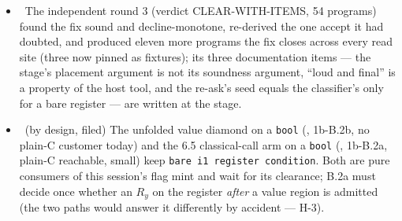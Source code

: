 \begin{itemize}
    decides ``same register'' at final taint --- so a rotation on a value derived from a
    classical-call merge is a \emph{source} to the fence and \emph{chained} to the lowering, and a
    sibling rotation on the same rail is invisible: the select's copies were controlled on
    \(R_y(0.9)R_y(0.25)|x\rangle\) while the condition named \(R_y(0.25)|x\rangle\), verify-clean and
    stage-2b clean. The \texttt{int} twin accepts on \texttt{main} with the same wrong stream ---
    pre-existing, filed as  (P1). Fixed by recording every emitted rail read and re-asking both
    rungs after the round-2 taint fixpoint, in both entry points, declining loudly (the pattern that
    already ships for the in-place rail tripwire); it is the third instance of the ``a stage that runs
    once has a round-2-false premise'' family and the first in a predicate rather than a stage. The
    fix's own first spelling missed one of the four places a register is read as a control (the
    nested conjunction), which the fix agent found from plain C before the third round --- the record
    now lives in the one function every such read goes through.
  \item \fdoc\ The independent round 3 (verdict CLEAR-WITH-ITEMS, 54 programs) found the fix sound
    and decline-monotone, re-derived the one accept it had doubted, and produced eleven more programs
    the fix closes across every read site (three now pinned as fixtures); its three documentation
    items --- the stage's placement argument is not its soundness argument, ``loud and final'' is a
    property of the host tool, and the re-ask's seed equals the classifier's only for a bare register
    --- are written at the stage.
  \item \foverdecline\ (by design, filed) The unfolded value diamond on a \texttt{bool} (,
    1b-B.2b, no plain-C customer today) and the 6.5 classical-call arm on a \texttt{bool} (,
    1b-B.2a, plain-C reachable, small) keep \texttt{bare i1 register condition}. Both are pure
    consumers of this session's flag mint and wait for its clearance; B.2a must decide once whether an
    \(R_y\) on the register \emph{after} a value region is admitted (the two paths would answer it
    differently by accident ---  H-3).
\end{itemize}

